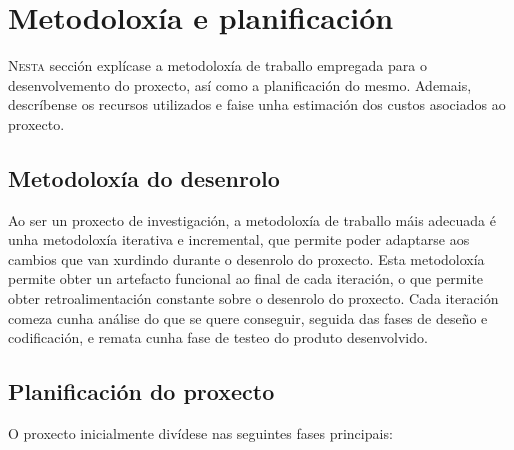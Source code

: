 \chapter{Metodoloxía e planificación}
\label{chap:Metodoloxía e planificación}
\lettrine{N}{esta} sección explícase a metodoloxía de traballo empregada para o desenvolvemento do proxecto, así como a planificación do mesmo.
 Ademais, descríbense os recursos utilizados e faise unha estimación dos custos asociados ao proxecto.

\section{Metodoloxía do desenrolo}
\label{sec:Metodoloxía do desenrolo}

Ao ser un proxecto de investigación, a metodoloxía de traballo máis adecuada é unha metodoloxía iterativa e incremental, que permite poder adaptarse aos cambios que van xurdindo durante o desenrolo do proxecto.
Esta metodoloxía permite obter un artefacto funcional ao final de cada iteración, o que permite obter retroalimentación constante sobre o desenrolo do proxecto.
Cada iteración comeza cunha análise do que se quere conseguir, seguida das fases de deseño e codificación, e remata cunha fase de testeo do produto desenvolvido.

\section{Planificación do proxecto}
\label{sec:Planificación do proxecto}
O proxecto inicialmente divídese nas seguintes fases principais:

